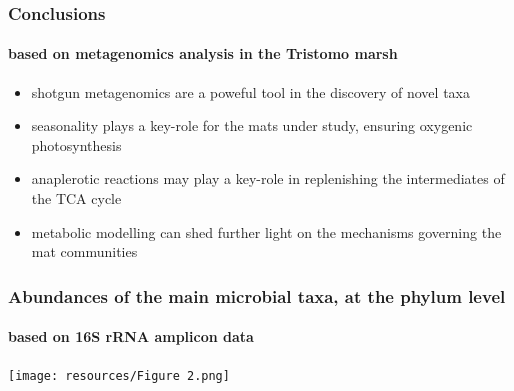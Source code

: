 \documentclass{beamer}
\begin{document}
   \begin{frame}
      \frametitle{Conclusions}
      \framesubtitle{based on metagenomics analysis in the Tristomo marsh}

      \begin{itemize}
         \small
         \item shotgun metagenomics are a poweful tool in the discovery of novel taxa 
         \item seasonality plays a key-role for the mats under study, ensuring oxygenic photosynthesis 
         \item anaplerotic reactions may play a key-role in replenishing the intermediates of the TCA cycle
         \item metabolic modelling can shed further light on the mechanisms governing the mat communities
      \end{itemize}

   \end{frame}

   \begin{frame}
      \frametitle{Abundances of the main microbial taxa, at the phylum level}
      \framesubtitle{based on 16S rRNA amplicon data}
      \centering
      \texttt{[image: resources/Figure 2.png]}

   \end{frame}
\end{document}
